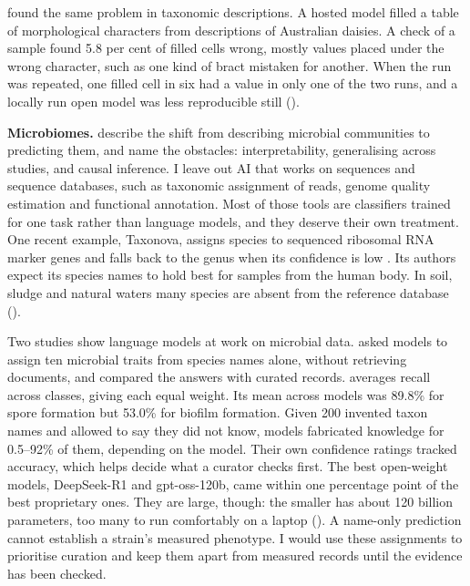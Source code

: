 \textcite{schmidtlebuhn2025morphology} found the same problem in taxonomic
descriptions. A hosted model filled a table of morphological characters from
descriptions of Australian daisies. A check of a sample found 5.8 per
cent of filled cells wrong, mostly values placed under the wrong character, such
as one kind of bract mistaken for another. When the run was repeated,
one filled cell in six had a value in only one of the two runs, and a locally run
open model was less reproducible still ().

\textbf{Microbiomes.} \textcite{yu2026microbiomes} describe the shift from
describing microbial communities to predicting them, and name the obstacles:
interpretability, generalising across studies, and causal inference. I leave
out AI that works on sequences and sequence databases, such as taxonomic
assignment of reads, genome quality estimation and functional annotation. Most
of those tools are classifiers trained for one task rather than language
models, and they deserve their own treatment. One recent example, Taxonova,
assigns species to sequenced ribosomal RNA marker genes and falls back to the
genus when its confidence is low \parencite{kakabra2026taxonova}. Its authors
expect its species names to hold best for samples from the human body. In
soil, sludge and natural waters many species are absent from the reference
database ().

Two studies show language models at work on microbial data.
\textcite{munch2026phenotypes} asked models to assign ten microbial traits from
species names alone, without retrieving documents, and compared the answers
with curated records.  averages recall across classes,
giving each equal weight. Its mean across models was 89.8\% for spore formation
but 53.0\% for biofilm formation. Given 200 invented taxon names and allowed to
say they did not know, models fabricated knowledge for 0.5--92\% of them,
depending on the model. Their own confidence ratings tracked accuracy, which
helps decide what a curator checks first. The best open-weight models,
DeepSeek-R1 and gpt-oss-120b, came within one percentage point of the best
proprietary ones. They are large, though: the smaller has about 120 billion
parameters, too many to run comfortably on a laptop (). A
name-only prediction cannot establish a strain's measured phenotype. I would use
these assignments to prioritise curation and keep them apart from measured
records until the evidence has been checked.

